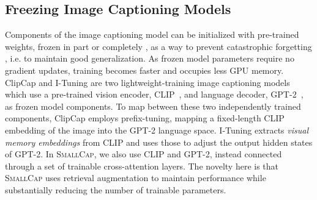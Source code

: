 \documentclass[10pt,twocolumn,letterpaper]{article}
\newcommand{\model}{\textsc{SmallCap}\xspace}
\begin{document}

\subsection{Freezing Image Captioning Models}


Components of the image captioning model can be initialized with pre-trained weights, frozen in part or completely \cite{alayrac2022flamingo}, as a way to prevent catastrophic forgetting \cite{mccloskey1989catastrophic}, i.e. to maintain good generalization. As frozen model parameters require no gradient updates, training becomes faster and occupies less GPU memory.
ClipCap and I-Tuning \cite{clipcap, luo2022tuning} are two lightweight-training image captioning models which use a pre-trained vision encoder, CLIP~\cite{radford2021learning}, and language decoder, GPT-2~\cite{radford2019language}, as frozen model components. %
To map between these two independently trained components, ClipCap employs prefix-tuning, mapping a fixed-length CLIP embedding of the image into the GPT-2 language space. I-Tuning extracts \textit{visual memory embeddings} from CLIP and uses those to adjust the output hidden states of GPT-2. In \model, we also use CLIP and GPT-2, instead connected through a set of trainable
cross-attention layers. The novelty here is that \model uses retrieval augmentation to maintain performance while substantially reducing the number of trainable parameters. %
\end{document}
